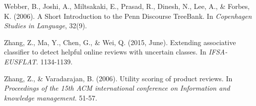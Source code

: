 \documentclass[
    a4paper,%
    12pt,%
    oneside,%
    toc=bibliography,
    final,
]{scrartcl}
\begin{document}
\begin{thebibliography}{9}
 Webber, B., Joshi, A., Miltsakaki, E., Prasad, R., Dinesh, N., Lee, A., \& Forbes, K. (2006). A Short Introduction to the Penn Discourse TreeBank. In \textit{Copenhagen Studies in Language}, 32(9).

 Zhang, Z., Ma, Y., Chen, G., \& Wei, Q. (2015, June). Extending associative classifier to detect helpful online reviews with uncertain classes. In \textit{IFSA-EUSFLAT}. 1134-1139.

 Zhang, Z., \& Varadarajan, B. (2006). Utility scoring of product reviews. In \textit{Proceedings of the 15th ACM international conference on Information and knowledge management}. 51-57.

\end{thebibliography}
\end{document}
